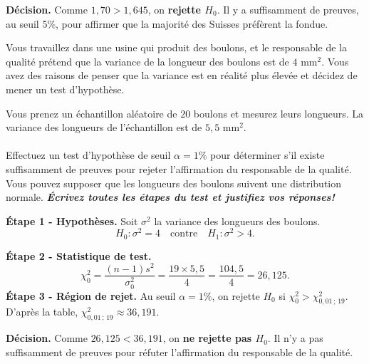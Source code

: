 \begin{questions}
\begin{solution}
\textbf{Décision.} Comme $1{,}70 > 1{,}645$, on \textbf{rejette $H_0$}. Il y a suffisamment de preuves, au seuil 5\%, pour affirmer que la majorité des Suisses préfèrent la fondue.
\end{solution}
\pageblanche
\question[10] Vous travaillez dans une usine qui produit des boulons, et le responsable de la qualité prétend que la variance de la longueur des boulons est de $4$ mm$^2$. Vous avez des raisons de penser que la variance est en réalité plus élevée et décidez de mener un test d'hypothèse.



Vous prenez un échantillon aléatoire de $20$ boulons et mesurez leurs longueurs. La variance des longueurs de l'échantillon est de $5,5$ mm$^2$. 
\\
\\
Effectuez un test d'hypothèse de seuil $\alpha=1\%$ pour déterminer s'il existe suffisamment de preuves pour rejeter l'affirmation du responsable de la qualité. Vous pouvez supposer que les longueurs des boulons suivent une distribution normale. \textbf{\textit{Écrivez toutes les étapes du test et justifiez vos réponses!}}

\begin{solution}
\textbf{Étape 1 - Hypothèses.} Soit $\sigma^2$ la variance des longueurs des boulons.
\[
H_0: \sigma^2 = 4 \quad \text{contre} \quad H_1: \sigma^2 > 4.
\]


\textbf{Étape 2 - Statistique de test.}
\[
\chi^2_0 = \frac{(n-1)s^2}{\sigma_0^2} = \frac{19 \times 5{,}5}{4} = \frac{104{,}5}{4} = 26{,}125.
\]
\textbf{Étape 3 - Région de rejet.} Au seuil $\alpha=1\%$, on rejette $H_0$ si $\chi^2_0 > \chi^2_{0{,}01\,;\,19}$. D'après la table, $\chi^2_{0{,}01\,;\,19} \approx 36{,}191$.

\textbf{Décision.} Comme $26{,}125 < 36{,}191$, on \textbf{ne rejette pas $H_0$}. Il n'y a pas suffisamment de preuves pour réfuter l'affirmation du responsable de la qualité.
\end{solution}



\end{questions}
 
